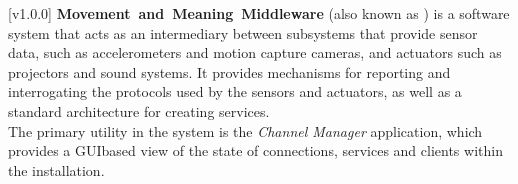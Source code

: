 [v1.0.0]
\textbf{Movement~and~Meaning~Middleware} (also known as \mplusm) is a software system
that acts as an intermediary between subsystems that provide sensor data, such as
accelerometers and motion capture cameras, and actuators such as projectors and sound
systems.
It provides mechanisms for reporting and interrogating the protocols used by the sensors
and actuators, as well as a standard architecture for creating services.\\

The primary utility in the \mplusm{} system is the \emph{Channel Manager} application,
which provides a GUI\longDash{}based view of the state of connections, services and
clients within the installation.
\primaryEnd{}
